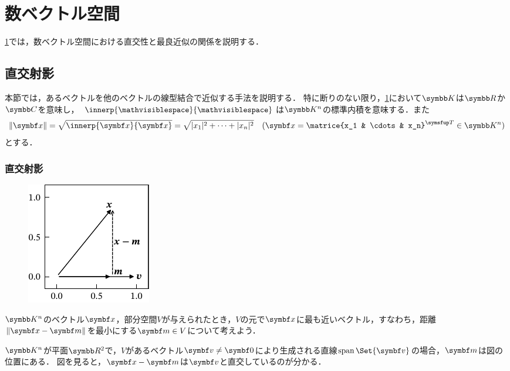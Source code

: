 \documentclass[../../main]{subfiles}
\begin{document}
\chapter{数ベクトル空間}
\label{chapter:numerical_vector_space}

\begin{lead}
  \cref{chapter:numerical_vector_space}では，数ベクトル空間における直交性と最良近似の関係を説明する．
\end{lead}

\section{直交射影}

本節では，あるベクトルを他のベクトルの線型結合で近似する手法を説明する．
特に断りのない限り，\cref{chapter:numerical_vector_space}において\(\numset{K}\)は\(\numset{R}\)か\(\numset{C}\)を意味し，
\(\innerp{\holder}{\holder}\)は\(\numset{K}^n\)の標準内積を意味する．また
\[
  \vnorm{\vect{x}} = \sqrt{\innerp{\vect{x}}{\vect{x}}}
  = \sqrt{\abs{x_1}^2+\dots+\abs{x_n}^2}
  \quad(\vect{x}=\trps{\matrice{x_1 & \cdots & x_n}}\in\numset{K}^n)
\]
とする\indexsymbol{\(\vnorm{\holder}\)}．

\subsection{直交射影}

\begin{figure}
  \includegraphics{figure/proj2d.pdf}
\end{figure}

\(\numset{K}^n\)のベクトル\(\vect{x}\)，部分空間\(V\)が与えられたとき，\(V\)の元で\(\vect{x}\)に最も近いベクトル，すなわち，距離\(\vnorm{\vect{x}-\vect{m}}\)を最小にする\(\vect{m}\in V\)について考えよう．

\(\numset{K}^n\)が平面\(\numset{R}^2\)で，\(V\)があるベクトル\(\vect{v}\neq\zvec\)により生成される直線\(\spannedby\Set{\vect{v}}\)の場合，\(\vect{m}\)は図の位置にある．
図を見ると，\(\vect{x}-\vect{m}\)は\(\vect{v}\)と直交しているのが分かる．
\end{document}
